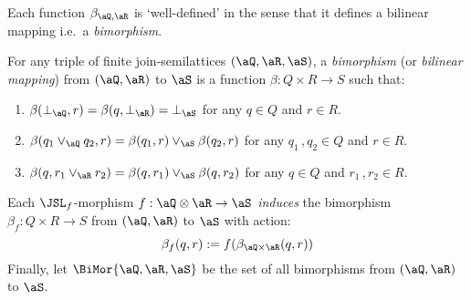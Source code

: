 \documentclass{article}
\begin{document}
\smallskip

Each function $\beta_{\aQ,\aR}$ is `well-defined' in the sense that it defines a bilinear mapping i.e.\ a \emph{bimorphism}.

\bigskip

\begin{definition}[Bimorphisms]
\label{def:bimorphism}
For any triple of finite join-semilattices $(\aQ,\aR,\aS)$, a \emph{bimorphism} (or \emph{bilinear mapping}) from $(\aQ,\aR)$ to $\aS$ is a function $\beta : Q \times R \to S$ such that:
\begin{enumerate}
\item
$\beta(\bot_\aQ,r) = \beta(q,\bot_\aR) = \bot_\aS$ for any $q \in Q$ and $r \in R$.
\item
$\beta(q_1 \lor_\aQ q_2,r) = \beta(q_1,r) \lor_\aS \beta(q_2,r)$ for any $q_1\,,q_2 \in Q$ and $r \in R$.
\item
$\beta(q,r_1 \lor_\aR r_2) = \beta(q,r_1) \lor_\aS \beta(q,r_2)$ for any $q \in Q$ and $r_1\,,r_2 \in R$.
\end{enumerate}
Each $\JSL_f$-morphism $f : \aQ \otimes \aR \to \aS$ \emph{induces} the bimorphism $\beta_f : Q \times R \to S$ from $(\aQ,\aR)$ to $\aS$ with action:
\[
\beta_f (q,r) := f(\beta_{\aQ \times \aR}(q,r))
\]
Finally, let $\BiMor{\aQ,\aR,\aS}$ be the set of all bimorphisms from  $(\aQ,\aR)$ to $\aS$. \endbox
\end{definition}

\bigskip
\end{document}
